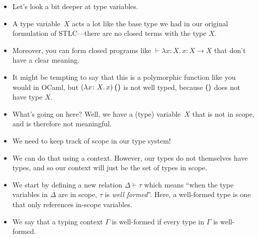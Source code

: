 \documentclass{lecturenotes}
\newcommand{\tabs}[3]{\ensuremath{\lambda #1 \colon #2.\,#3}}
\newcommand{\app}[2]{\ensuremath{#1\;#2}}
\newcommand{\utype}{\textsf{unit}\xspace}
\newcommand{\unit}{\ensuremath{\textsf{(}\mkern0.5mu\textsf{)}}}
\newcommand{\prodtype}[2]{\ensuremath{#1 \times #2}}
\newcommand{\sumtype}[2]{\ensuremath{#1 + #2}}
\newcommand{\rectype}[2]{\ensuremath{\mu #1.\,#2}}
\begin{document}
\begin{itemize}
\item Let's look a bit deeper at type variables.
\item A type variable~$X$ acts a lot like the base type we had in our original formulation of STLC---there are no closed terms with the type $X$.
\item Moreover, you can form closed programs like $\vdash \tabs{x}{X}{x} : X \to X$ that don't have a clear meaning.
\item It might be tempting to say that this is a polymorphic function like you would in OCaml, but $\app{(\tabs{x}{X}{x})}{\unit}$ is not well typed, because $\unit$ does not have type $X$.
\item What's going on here?
  Well, we have a (type) variable~$X$ that is not in scope, and is therefore not meaningful.
\item We need to keep track of scope in our type system!
\item We can do that using a context.
  However, our types do not themselves have types, and so our context will just be the set of types in scope.
\item We start by defining a new relation $\Delta \vdash \tau$ which means ``when the type variables in $\Delta$ are in scope, $\tau$ is \emph{well formed}''.
  Here, a well-formed type is one that only references in-scope variables.
\end{itemize}


\begin{itemize}
\item We say that a typing context $\Gamma$ is well-formed if every type in $\Gamma$ is well-formed.
\end{itemize}
\end{document}
